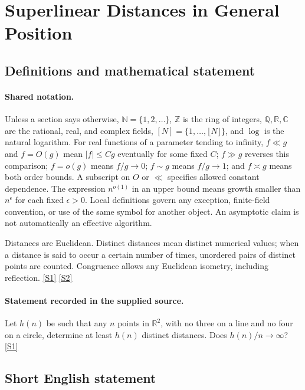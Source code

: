 \documentclass[11pt,a4paper]{article}
\newcommand{\N}{\mathbb{N}}
\newcommand{\Z}{\mathbb{Z}}
\newcommand{\Q}{\mathbb{Q}}
\newcommand{\R}{\mathbb{R}}
\newcommand{\C}{\mathbb{C}}
\newcommand{\sref}[2]{\hyperlink{source:#1:#2}{[S#2]}}
\begin{document}
\section{Superlinear Distances in General Position}\label{statement}


\subsection{Definitions and mathematical statement}

\paragraph{Shared notation.}Unless a section says otherwise, $\N=\{1,2,\ldots\}$,
$\Z$ is the ring of integers, $\Q,\R,\C$ are the rational, real, and complex
fields, $[N]=\{1,\ldots,\lfloor N\rfloor\}$, and $\log$ is the natural
logarithm. For real functions of a parameter tending to infinity,
$f\ll g$ and $f=O(g)$ mean $|f|\leq Cg$ eventually for some fixed $C$;
$f\gg g$ reverses this comparison; $f=o(g)$ means $f/g\to0$;
$f\sim g$ means $f/g\to1$; and $f\asymp g$ means both order bounds.
A subscript on $O$ or $\ll$ specifies allowed constant dependence.
The expression $n^{o(1)}$ in an upper bound means growth smaller than
$n^\epsilon$ for each fixed $\epsilon>0$. Local definitions govern any
exception, finite-field convention, or use of the same symbol for another
object. An asymptotic claim is not automatically an effective algorithm.



Distances are Euclidean. Distinct distances mean distinct numerical values; when a distance is said to occur a certain number of times, unordered pairs of distinct points are counted. Congruence allows any Euclidean isometry, including reflection. \sref{statement}{1} \sref{statement}{2}

\paragraph{Statement recorded in the supplied source.}
Let $h(n)$ be such that any $n$ points in $\mathbb{R}^2$, with no three on a line and no four on a circle, determine at least $h(n)$ distinct distances. Does $h(n)/n\to \infty$? \sref{statement}{1}

\subsection{Short English statement}
\end{document}
